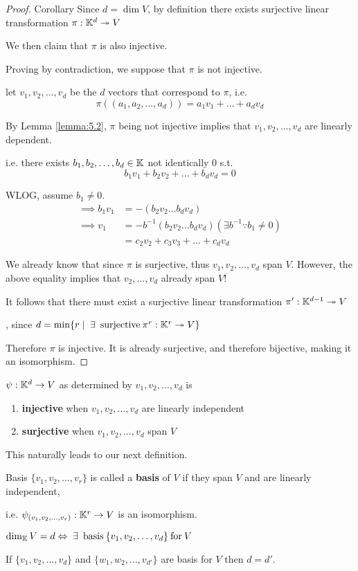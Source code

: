 \begin{proof}{Corollary}
    Since \(d = \dim V\), by definition there exists surjective linear transformation \(\pi: \mathbb{K}^d \twoheadrightarrow V\)

    We then claim that \(\pi\) is also injective.

    Proving by contradiction, we suppose that \(\pi\) is not injective.
    
    let \(v_1, v_2, \dots, v_d\) be the \(d\) vectors that correspond to \(\pi\), i.e. \[
    \pi((a_1, a_2, \dots, a_d)) = a_1v_1 + \dots + a_dv_d
    \]

    By Lemma \ref{lemma:5.2}, \(\pi\) being not injective implies that \(v_1, v_2, \dots, v_d\) are linearly dependent.

    i.e. there exists \(b_1, b_2, \dots, b_d \in \mathbb{K}\) not identically 0 s.t. \[
    b_1v_1 + b_2v_2 + \dots + b_dv_d = 0
    \]

    WLOG, assume \(b_1 \neq 0\).
    \begin{align*}
        \implies b_1v_1 &= -(b_2v_2 \dots b_dv_d) \\
        \implies v_1 &= -b^{-1}(b_2v_2 \dots b_dv_d) (\exists b^{-1} \because b_1 \neq 0) \\
        &= c_2v_2 + c_3v_3 + \dots + c_dv_d
    \end{align*}

    We already know that since \(\pi\) is surjective, thus \(v_1, v_2, \dots, v_d\) span \(V\). However, the above equality implies that \(v_2, \dots, v_d\) already span \(V\)!
    
    It follows that there must exist a surjective linear transformation \(\pi': \mathbb{K}^{d-1} \twoheadrightarrow V\)

    \contra, since \(d = \min\{r \mid \exists \:\text{surjective}\: \pi^r: \bbk^r \twoheadrightarrow V\}\)

    Therefore \(\pi\) is injective. It is already surjective, and therefore bijective, making it an isomorphism.
\end{proof}

\begin{recall}
    \(\psi: \mathbb{K}^d \to V\) as determined by \(v_1, v_2, \dots, v_d\) is 
    \begin{enumerate}
        \item \textbf{injective} when \(v_1, v_2, \dots, v_d\) are linearly independent
        \item \textbf{surjective} when \(v_1, v_2, \dots, v_d\) span \(V\)
    \end{enumerate}

    This naturally leads to our next definition.
\end{recall}
\begin{definition} {Basis}
    \(\{v_1, v_2, \dots, v_r\}\) is called a \textbf{basis} of \(V\) if they span \(V\) and are linearly independent,
    
    i.e. \(\psi_{(v_1, v_2, \dots, v_r)}: \mathbb{K}^r \to V\) is an isomorphism.
\end{definition}

\begin{corollary}
    \(
    \dim_\bbk V = d \Leftrightarrow \exists \:\text{basis}\: \{v_1, v_2, \dots, v_d\} \:\text{for}\: V
    \)
\end{corollary}
\begin{corollary}
    If \(\{v_1, v_2, \dots, v_d\}\) and \(\{w_1, w_2, \dots, v_{d'}\}\) are basis for \(V\) then \(d = d'\).
\end{corollary}